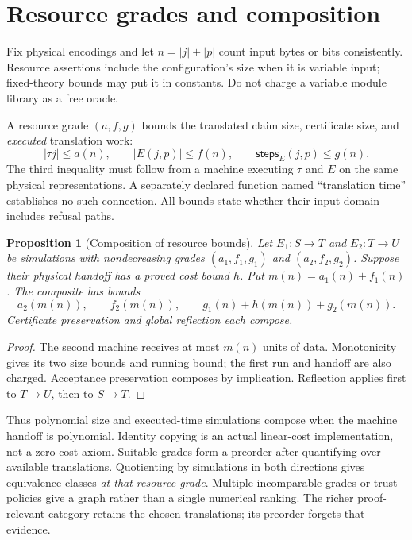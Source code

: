 \documentclass[11pt]{article}
\newtheorem{proposition}[definition]{Proposition}
\newcommand{\size}[1]{\lvert #1\rvert}
\begin{document}
\section{Resource grades and composition}
Fix physical encodings and let $n=\size{j}+\size{p}$ count input bytes or
bits consistently. Resource assertions include the configuration's size
when it is variable input; fixed-theory bounds may put it in constants.
Do not charge a variable module library as a free oracle.

A resource grade $(a,f,g)$ bounds the translated claim size, certificate
size, and \emph{executed} translation work:
\[
 \size{\tau j}\le a(n),\qquad
 \size{E(j,p)}\le f(n),\qquad
 \mathsf{steps}_{E}(j,p)\le g(n).
\]
The third inequality must follow from a machine executing $\tau$ and $E$
on the same physical representations. A separately declared function
named ``translation time'' establishes no such connection. All bounds
state whether their input domain includes refusal paths.

\begin{proposition}[Composition of resource bounds]
Let $E_1:S\to T$ and $E_2:T\to U$ be simulations with nondecreasing grades
$(a_1,f_1,g_1)$ and $(a_2,f_2,g_2)$. Suppose their physical handoff has a
proved cost bound $h$. Put $m(n)=a_1(n)+f_1(n)$. The composite has bounds
\[
 a_2(m(n)),\qquad f_2(m(n)),\qquad
 g_1(n)+h(m(n))+g_2(m(n)).
\]
Certificate preservation and global reflection each compose.
\end{proposition}
\begin{proof}
The second machine receives at most $m(n)$ units of data. Monotonicity
gives its two size bounds and running bound; the first run and handoff
are also charged. Acceptance preservation composes by implication.
Reflection applies first to $T\to U$, then to $S\to T$.
\end{proof}

Thus polynomial size and executed-time simulations compose when the
machine handoff is polynomial. Identity copying is an actual linear-cost
implementation, not a zero-cost axiom. Suitable grades form a preorder
after quantifying over available translations. Quotienting by simulations
in both directions gives equivalence classes \emph{at that resource grade}.
Multiple incomparable grades or trust policies give a graph rather than a
single numerical ranking. The richer proof-relevant category retains the
chosen translations; its preorder forgets that evidence.
\end{document}
